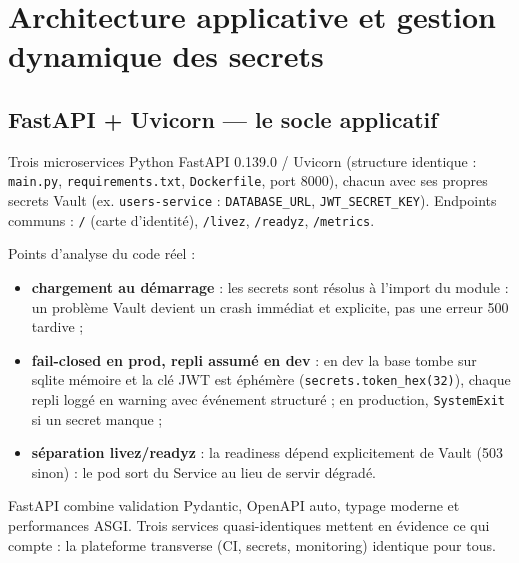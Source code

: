 \documentclass[12pt,a4paper,oneside]{report}
\begin{document}
\clearpage
\chapter[Architecture applicative et secrets]{Architecture applicative et gestion dynamique des secrets}

\section{FastAPI + Uvicorn --- le socle applicatif}

Trois microservices Python FastAPI 0.139.0 / Uvicorn (structure identique : \texttt{main.py}, \texttt{requirements.txt}, \texttt{Dockerfile}, port 8000), chacun avec ses propres secrets Vault (ex. \texttt{users-service} : \texttt{DATABASE\_URL}, \texttt{JWT\_SECRET\_KEY}). Endpoints communs : \texttt{/} (carte d'identité), \texttt{/livez}, \texttt{/readyz}, \texttt{/metrics}.

Points d'analyse du code réel :
\begin{itemize}[itemsep=2pt]
  \item \textbf{chargement au démarrage} : les secrets sont résolus à l'import du module : un problème Vault devient un crash immédiat et explicite, pas une erreur 500 tardive ;
  \item \textbf{fail-closed en prod, repli assumé en dev} : en dev la base tombe sur sqlite mémoire et la clé JWT est éphémère (\texttt{secrets.token\_hex(32)}), chaque repli loggé en warning avec événement structuré ; en production, \texttt{SystemExit} si un secret manque ;
  \item \textbf{séparation livez/readyz} : la readiness dépend explicitement de Vault (503 sinon) : le pod sort du Service au lieu de servir dégradé.
\end{itemize}

\begin{whybox}
FastAPI combine validation Pydantic, OpenAPI auto, typage moderne et performances ASGI. Trois services quasi-identiques mettent en évidence ce qui compte : la plateforme transverse (CI, secrets, monitoring) identique pour tous.
\end{whybox}
\end{document}
